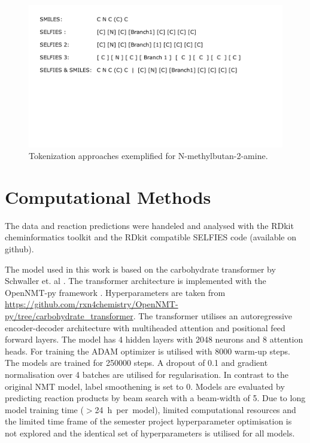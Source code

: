 \documentclass[10pt,conference,compsocconf]{IEEEtran}
\begin{document}
\begin{figure}[h]
    \centering
    \includegraphics[width = 1\linewidth, trim={1.25cm 9.75cm 3.5cm 1.25cm},clip]{./figures/representation.pdf}
    \caption{Tokenization approaches exemplified for N-methylbutan-2-amine.}
    \label{fig:tokenization_approaches}
\end{figure} 

\section{Computational Methods}

The data and reaction predictions were handeled and analysed with the RDkit \cite{noauthor_rdkit_nodate} cheminformatics toolkit and the RDkit compatible SELFIES code (available on github).\cite{noauthor_selfies_2021}

The model used in this work is based on the carbohydrate transformer by Schwaller et. al \cite{Pesciullesi.2020}. The transformer architecture is implemented with the OpenNMT-py framework \cite{klein-etal-2017-opennmt}. Hyperparameters are taken from \url{https://github.com/rxn4chemistry/OpenNMT-py/tree/carbohydrate_transformer}. The transformer utilises an autoregressive encoder-decoder architecture with multiheaded attention and positional feed forward layers. The model has 4 hidden layers with 2048 neurons and 8 attention heads. For training the ADAM optimizer is utilised with 8000 warm-up steps. The models are trained for 250000 steps. A dropout of 0.1 and gradient normalisation over 4 batches are utilised for regularisation. In contrast to the original NMT model, label smoothening is set to 0. Models are evaluated by predicting reaction products by beam search with a beam-width of 5. Due to long model training time ($>$24~h~per~model), limited computational resources and the limited time frame of the semester project hyperparameter optimisation is not explored and the identical set of hyperparameters is utilised for all models.
\end{document}

